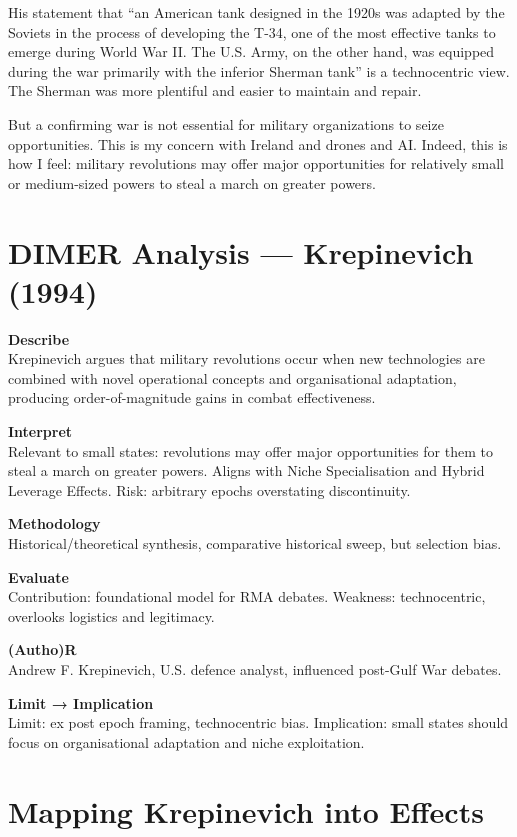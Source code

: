 His statement that ``an American tank designed in the 1920s was adapted by the Soviets in the process of developing the T-34, one of the most effective tanks to emerge during World War II. The U.S. Army, on the other hand, was equipped during the war primarily with the inferior Sherman tank'' is a technocentric view. The Sherman was more plentiful and easier to maintain and repair.  

But a confirming war is not essential for military organizations to seize opportunities. This is my concern with Ireland and drones and AI. Indeed, this is how I feel: military revolutions may offer major opportunities for relatively small or medium-sized powers to steal a march on greater powers.  

\section*{DIMER Analysis — Krepinevich (1994)}

\textbf{Describe} \\
Krepinevich argues that military revolutions occur when new technologies are combined with novel operational concepts and organisational adaptation, producing order-of-magnitude gains in combat effectiveness.  

\textbf{Interpret} \\
Relevant to small states: revolutions may offer major opportunities for them to steal a march on greater powers. Aligns with Niche Specialisation and Hybrid Leverage Effects. Risk: arbitrary epochs overstating discontinuity.  

\textbf{Methodology} \\
Historical/theoretical synthesis, comparative historical sweep, but selection bias.  

\textbf{Evaluate} \\
Contribution: foundational model for RMA debates. Weakness: technocentric, overlooks logistics and legitimacy.  

\textbf{(Autho)R} \\
Andrew F. Krepinevich, U.S. defence analyst, influenced post-Gulf War debates.  

\textbf{Limit → Implication} \\
Limit: ex post epoch framing, technocentric bias.  
Implication: small states should focus on organisational adaptation and niche exploitation.  

\section*{Mapping Krepinevich into Effects}

